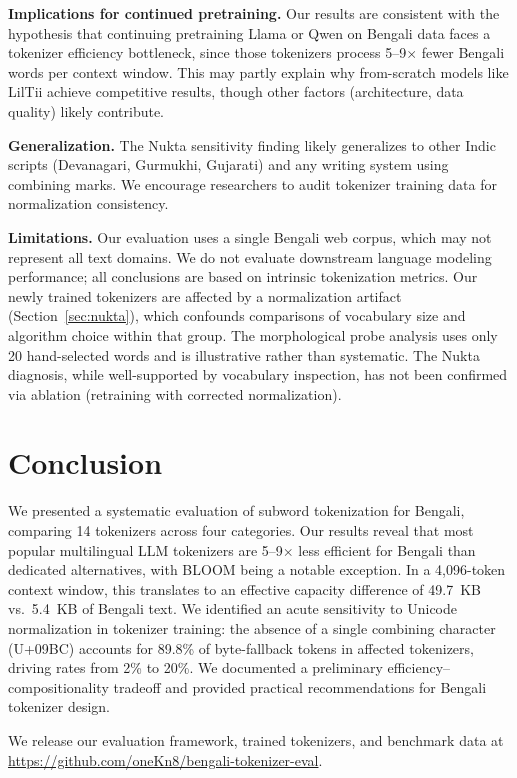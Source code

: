\documentclass[11pt,a4paper]{article}
\begin{document}
\textbf{Implications for continued pretraining.} Our results are consistent with the hypothesis that continuing pretraining Llama or Qwen on Bengali data \cite{titulm2025,tigerllm2025} faces a tokenizer efficiency bottleneck, since those tokenizers process 5--9$\times$ fewer Bengali words per context window.
This may partly explain why from-scratch models like LilTii achieve competitive results, though other factors (architecture, data quality) likely contribute.

\textbf{Generalization.} The Nukta sensitivity finding likely generalizes to other Indic scripts (Devanagari, Gurmukhi, Gujarati) and any writing system using combining marks.
We encourage researchers to audit tokenizer training data for normalization consistency.

\textbf{Limitations.} Our evaluation uses a single Bengali web corpus, which may not represent all text domains.
We do not evaluate downstream language modeling performance; all conclusions are based on intrinsic tokenization metrics.
Our newly trained tokenizers are affected by a normalization artifact (Section~\ref{sec:nukta}), which confounds comparisons of vocabulary size and algorithm choice within that group.
The morphological probe analysis uses only 20 hand-selected words and is illustrative rather than systematic.
The Nukta diagnosis, while well-supported by vocabulary inspection, has not been confirmed via ablation (retraining with corrected normalization).

\section{Conclusion}

We presented a systematic evaluation of subword tokenization for Bengali, comparing 14 tokenizers across four categories.
Our results reveal that most popular multilingual LLM tokenizers are 5--9$\times$ less efficient for Bengali than dedicated alternatives, with BLOOM being a notable exception.
In a 4,096-token context window, this translates to an effective capacity difference of 49.7~KB vs.\ 5.4~KB of Bengali text.
We identified an acute sensitivity to Unicode normalization in tokenizer training: the absence of a single combining character (U+09BC) accounts for 89.8\% of byte-fallback tokens in affected tokenizers, driving rates from 2\% to 20\%.
We documented a preliminary efficiency--compositionality tradeoff and provided practical recommendations for Bengali tokenizer design.

We release our evaluation framework, trained tokenizers, and benchmark data at \url{https://github.com/oneKn8/bengali-tokenizer-eval}.


\end{document}
